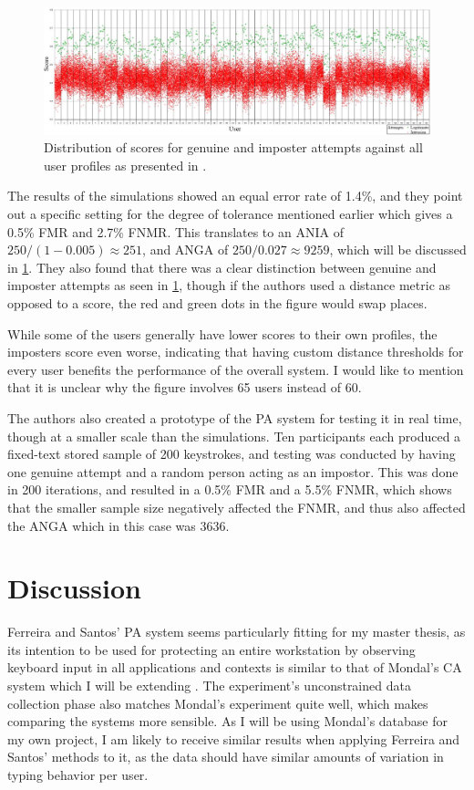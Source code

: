 \documentclass[informationsecurity]{gucmasterproject}
\begin{document}
\begin{figure}[h]
    \centering
    \includegraphics[width=1\textwidth]{ferreira/distr}
    \caption{Distribution of scores for genuine and imposter attempts against all user profiles as presented in \cite{superResults}.}
    \label{fig:ferreira-distr}
\end{figure}

The results of the simulations showed an equal error rate of 1.4\%, and they point out a specific setting for the degree of tolerance mentioned earlier which gives a 0.5\% FMR and 2.7\% FNMR.
This translates to an ANIA of $250 / (1-0.005) \approx{251}$, and ANGA of $250 / 0.027  \approx{9259}$, which will be discussed in \cref{sec:ferreira-discussion}.
They also found that there was a clear distinction between genuine and imposter attempts as seen in \cref{fig:ferreira-distr}, though if the authors used a distance metric as opposed to a score, the red and green dots in the figure would swap places. 

While some of the users generally have lower scores to their own profiles, the imposters score even worse, indicating that having custom distance thresholds for every user benefits the performance of the overall system.
I would like to mention that it is unclear why the figure involves 65 users instead of 60.

The authors also created a prototype of the PA system for testing it in real time, though at a smaller scale than the simulations.
Ten participants each produced a fixed-text stored sample of 200 keystrokes, and testing was conducted by having one genuine attempt and a random person acting as an impostor. This was done in 200 iterations, and resulted in a 0.5\% FMR and a 5.5\% FNMR, which shows that the smaller sample size negatively affected the FNMR, and thus also affected the ANGA which in this case was 3636.

\section{Discussion}
\label{sec:ferreira-discussion}
Ferreira and Santos' PA system seems particularly fitting for my master thesis, as its intention to be used for protecting an entire workstation by observing keyboard input in all applications and contexts is similar to that of Mondal's CA system which I will be extending \cite{mondal}.
The experiment's unconstrained data collection phase also matches Mondal's experiment quite well, which makes comparing the systems more sensible.
As I will be using Mondal's database for my own project, I am likely to receive similar results when applying Ferreira and Santos' methods to it, as the data should have similar amounts of variation in typing behavior per user.
\end{document}
